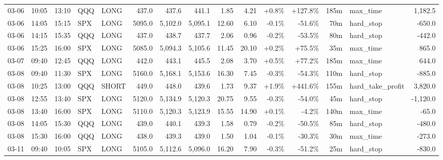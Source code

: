 \documentclass[11pt,a4paper,twoside]{article}
\begin{document}
\begin{landscape}
\begin{center}
\begin{longtable}{>{\color{txtmain}}l l l l l r r r r r r r r >{\color{txtmain}}l r}
03-06 & 10:05 & 13:10 & QQQ & LONG & 437.0 & 437.6 & 441.1 & 1.85 & 4.21 & \textcolor{wingreen}{+0.8\%} & \textcolor{wingreen}{+127.8\%} & 185m & max\_time & \textcolor{wingreen}{1,182.5} \\
03-06 & 14:05 & 15:15 & SPX & LONG & 5095.0 & 5,102.0 & 5,095.1 & 12.60 & 6.10 & \textcolor{lossred}{-0.1\%} & \textcolor{lossred}{-51.6\%} & 70m & hard\_stop & \textcolor{lossred}{-650.0} \\
03-06 & 14:15 & 15:35 & QQQ & LONG & 437.0 & 438.7 & 437.7 & 2.06 & 0.96 & \textcolor{lossred}{-0.2\%} & \textcolor{lossred}{-53.5\%} & 80m & hard\_stop & \textcolor{lossred}{-442.0} \\
03-06 & 15:25 & 16:00 & SPX & LONG & 5085.0 & 5,094.3 & 5,105.6 & 11.45 & 20.10 & \textcolor{wingreen}{+0.2\%} & \textcolor{wingreen}{+75.5\%} & 35m & max\_time & \textcolor{wingreen}{865.0} \\
03-07 & 09:40 & 12:45 & QQQ & LONG & 442.0 & 443.1 & 445.5 & 2.08 & 3.70 & \textcolor{wingreen}{+0.5\%} & \textcolor{wingreen}{+77.2\%} & 185m & max\_time & \textcolor{wingreen}{644.0} \\
03-08 & 09:40 & 11:30 & SPX & LONG & 5160.0 & 5,168.1 & 5,153.6 & 16.30 & 7.45 & \textcolor{lossred}{-0.3\%} & \textcolor{lossred}{-54.3\%} & 110m & hard\_stop & \textcolor{lossred}{-885.0} \\
03-08 & 10:25 & 13:00 & QQQ & SHORT & 449.0 & 448.0 & 439.6 & 1.73 & 9.37 & \textcolor{wingreen}{+1.9\%} & \textcolor{wingreen}{+441.6\%} & 155m & hard\_take\_profit & \textcolor{wingreen}{3,820.0} \\
03-08 & 12:55 & 13:40 & SPX & LONG & 5120.0 & 5,134.9 & 5,120.3 & 20.75 & 9.55 & \textcolor{lossred}{-0.3\%} & \textcolor{lossred}{-54.0\%} & 45m & hard\_stop & \textcolor{lossred}{-1,120.0} \\
03-08 & 13:40 & 16:00 & SPX & LONG & 5110.0 & 5,120.3 & 5,123.9 & 15.55 & 14.90 & \textcolor{wingreen}{+0.1\%} & \textcolor{lossred}{-4.2\%} & 140m & max\_time & \textcolor{lossred}{-65.0} \\
03-08 & 14:05 & 15:30 & QQQ & LONG & 439.0 & 440.1 & 439.3 & 1.58 & 0.79 & \textcolor{lossred}{-0.2\%} & \textcolor{lossred}{-50.5\%} & 85m & hard\_stop & \textcolor{lossred}{-480.0} \\
03-08 & 15:30 & 16:00 & QQQ & LONG & 438.0 & 439.3 & 439.0 & 1.50 & 1.04 & \textcolor{lossred}{-0.1\%} & \textcolor{lossred}{-30.3\%} & 30m & max\_time & \textcolor{lossred}{-273.0} \\
03-11 & 09:40 & 10:05 & SPX & LONG & 5105.0 & 5,112.6 & 5,096.0 & 16.20 & 7.90 & \textcolor{lossred}{-0.3\%} & \textcolor{lossred}{-51.2\%} & 25m & hard\_stop & \textcolor{lossred}{-830.0} \\

\end{longtable}
\end{center}
\end{landscape}
\end{document}
